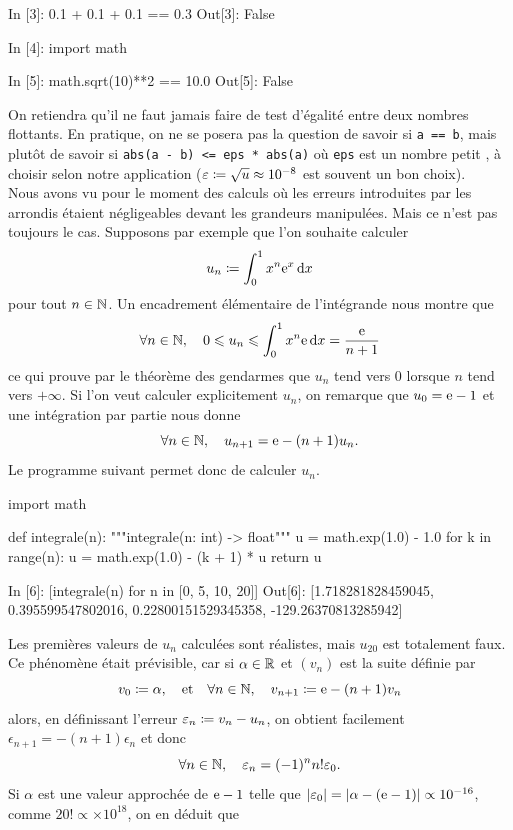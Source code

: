 \documentclass{magnoliaold}
\begin{document}
\begin{pythoncode}
In [3]: 0.1 + 0.1 + 0.1 == 0.3
Out[3]: False

In [4]: import math

In [5]: math.sqrt(10)**2 == 10.0 
Out[5]: False
\end{pythoncode}

\noindent
On retiendra qu'il ne faut jamais faire de test d'égalité entre deux nombres
flottants. En pratique, on ne se posera pas la question de savoir si \verb!a == b!, mais
plutôt de savoir si \verb!abs(a - b) <= eps * abs(a)! où \verb!eps! est un nombre
\og petit \fg, à choisir selon notre application ($\varepsilon\coloneqq\sqrt{u}\approx 10^{-8}$
est souvent un bon choix).\\

Nous avons vu pour le moment des calculs où les erreurs introduites par les arrondis
étaient négligeables devant les grandeurs manipulées. Mais ce n'est pas toujours le
cas. Supposons par exemple que l'on souhaite calculer
\[u_n\coloneqq\int_{0}^{1} x^n {\rm e}^x\,\text{d}x\]
pour tout $n\in\mathbb{N}$. Un encadrement élémentaire de l'intégrande nous montre que
\[\forall n\in\mathbb{N},\quad 0\leqslant u_n\leqslant \int_{0}^{1} x^n {\rm e}\,\text{d}x=\frac{{\rm e}}{n+1}\]
ce qui prouve par le théorème des gendarmes que $u_n$ tend vers
0 lorsque $n$ tend vers $+\infty$. Si l'on veut calculer explicitement $u_n$, 
on remarque que $u_0={\rm e}-1$ et une intégration par partie nous donne
\[\forall n\in\mathbb{N},\quad u_{n+1}={\rm e}-(n+1) u_{n}.\]
Le programme suivant permet donc de calculer $u_n$.
\begin{pythoncodeline}
import math

def integrale(n):
    """integrale(n: int) -> float"""
    u = math.exp(1.0) - 1.0
    for k in range(n):
        u = math.exp(1.0) - (k + 1) * u
    return u
\end{pythoncodeline}
\begin{pythoncode}
In [6]: [integrale(n) for n in [0, 5, 10, 20]]
Out[6]: [1.718281828459045, 0.395599547802016,
         0.22800151529345358, -129.26370813285942]
\end{pythoncode}
Les premières valeurs de $u_n$ calculées sont réalistes, mais $u_{20}$ est
totalement faux. Ce phénomène
était prévisible, car si $\alpha\in\mathbb{R}$ et $(v_n)$ est la suite définie par
\[v_0\coloneqq\alpha,\quad \text{et}\quad \forall n\in\mathbb{N},\quad v_{n+1}\coloneqq {\rm e}-(n+1)v_n\]
alors, en définissant l'erreur $\varepsilon_n\coloneqq v_n-u_n$, on obtient facilement $\epsilon_{n+1} = -(n+1)\epsilon_n$ et donc
\[\forall n\in\mathbb{N},\quad \varepsilon_n=(-1)^n n! \varepsilon_0.\]
Si $\alpha$ est une valeur approchée de ${\rm e} - 1$ telle que $\left|\varepsilon_0\right| = \left|\alpha - ({\rm e} - 1)\right| \propto 10^{-16}$, comme $20! \propto \times10^{18}$, on en déduit que
\end{document}
